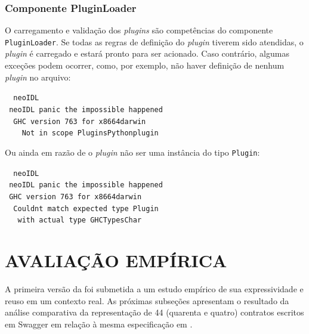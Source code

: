\subsubsection{Componente PluginLoader}
\label{compPluginLoader}

O carregamento e validação dos \textit{plugins} são competências do componente
\texttt{PluginLoader}. Se todas as regras de definição do \textit{plugin}
tiverem sido atendidas, o \textit{plugin} é carregado e estará pronto para ser
 acionado. Caso contrário, algumas exceções podem ocorrer, como, por exemplo, não haver definição de
nenhum \textit{plugin} no arquivo:

\begin{tabbing}\tt
~neoIDL\\
\tt ~neoIDL~panic~the~impossible~happened\\
\tt ~~GHC~version~763~for~x8664darwin\\
\tt ~~~~Not~in~scope~PluginsPythonplugin
\end{tabbing}

Ou ainda em razão de o \textit{plugin} não ser uma instância do tipo
\texttt{Plugin}:

\begin{tabbing}\tt
~neoIDL\\
\tt ~neoIDL~panic~the~impossible~happened\\
\tt ~GHC~version~763~for~x8664darwin\\
\tt ~~Couldnt~match~expected~type~Plugin\\
\tt ~~~with~actual~type~GHCTypesChar
\end{tabbing}


\section{AVALIAÇÃO EMPÍRICA}
\label{EstudoExpressividadeReuso}
\vspace{-6mm}

A primeira versão da \neoidl{} foi submetida a um estudo empírico de sua expressividade 
e reuso em um contexto real. As próximas subseções apresentam 
o resultado da análise comparativa da representação de 44 (quarenta e quatro)
contratos escritos em Swagger em relação à mesma especificação em \neoidl{}.

